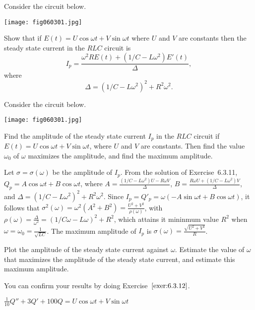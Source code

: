 \documentclass{ximera}
\begin{document}
\begin{problem}\label{exer:6.3.11}  Consider the circuit below.

\begin{image}
  \texttt{[image: fig060301.jpg]}
\end{image}

Show that if $E(t)=U\cos\omega t+V\sin\omega t$ where $U$
and $V$ are constants then the steady state current in
the $RLC$ circuit is
$$
I_p=\frac{\omega^2RE(t)+(1/C-L\omega^2)E'(t)}{\Delta},
$$
where
$$
\Delta=(1/C-L\omega^2)^2+R^2\omega^2.
$$
\end{problem}

\begin{problem}\label{exer:6.3.12}  Consider the circuit below.

\begin{image}
  \texttt{[image: fig060301.jpg]}
\end{image}

Find the amplitude of the steady state current $I_p$ in the $RLC$
circuit if $E(t)=U\cos\omega
t+V\sin\omega t$, where $U$ and $V$ are constants. Then find the value
$\omega_0$ of $\omega$ maximizes the amplitude, and
 find the maximum amplitude.

 \begin{solution}
     Let $\sigma=\sigma(\omega)$ be the amplitude of $I_p$.
From the solution of  Exercise~6.3.11,
$Q_p=A\cos\omega t+B\cos\omega t$, where
$A=\frac{(1/C-L\omega^2)U-R\omega V}{\Delta}$,
$B=\frac{R\omega U+(1/C-L\omega^2)V}{\Delta}$,  and
$\Delta=(1/C-L\omega^2)^2+R^2\omega^2$. Since
$I_p=Q'_p=\omega(-A\sin\omega t+B\cos\omega t)$, it follows that
$\sigma^2(\omega)=\omega^2(A^2+B^2)=\frac{U^2+V^2}{\rho(\omega)}$,
with
$\rho(\omega)=\frac{\Delta}{\omega^2}=(1/C\omega-L\omega)^2+R^2$,
which attains it mininmum value $R^2$ when
$\omega=\omega_0=\frac{1}{\sqrt{LC}}$. The maximum amplitude of
$I_p$ is
$\sigma(\omega)=\frac{\sqrt{U^2+V^2}}{ R}$.
 \end{solution}
\end{problem}

\begin{problem}\label{exer:6.3.13} Plot the
amplitude of the steady state current against $\omega$. Estimate the
value of $\omega$ that maximizes the amplitude of the steady state
current, and estimate this maximum amplitude. 
\begin{hint}
    You can confirm
your results by doing Exercise~$\ref{exer:6.3.12}$.
\end{hint}
$\frac{1}{10}Q''+3Q'+100Q=U\cos\omega t+V\sin\omega t$
\end{problem}
\end{document}
